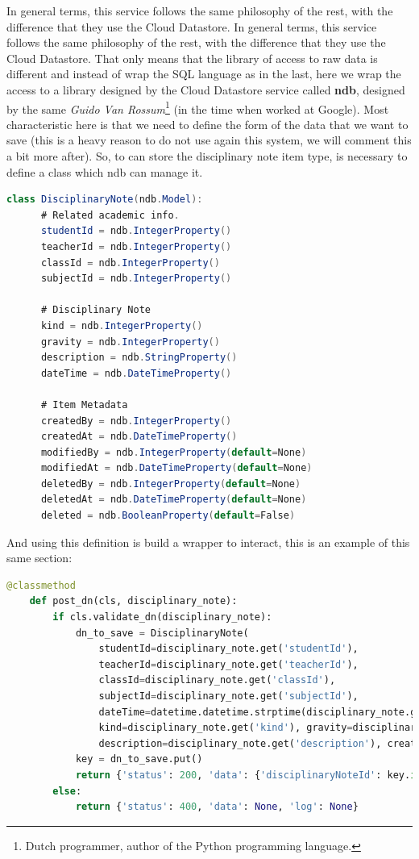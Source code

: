 In general terms, this service follows the same philosophy of the rest, with the
difference that they use the Cloud Datastore. In general terms, this service follows
the same philosophy of the rest, with the difference that they use the Cloud Datastore.
That only means that the library of access to raw data is different and instead of
wrap the SQL language as in the last, here we wrap the access to a library designed
by the Cloud Datastore service called \textbf{ndb}, designed by the same \textit{Guido Van
Rossum}\footnote{Dutch programmer, author of the Python programming language.} (in the time when worked at Google).
\intro
Most characteristic here is that we need to define the form of the data that we
want to save (this is a heavy reason to do not use again this system, we will
comment this a bit more after).
So, to can store the disciplinary note item type, is necessary to define a
class which ndb can manage it.
\begin{lstlisting}[language=java,frame=none]
  class DisciplinaryNote(ndb.Model):
      # Related academic info.
      studentId = ndb.IntegerProperty()
      teacherId = ndb.IntegerProperty()
      classId = ndb.IntegerProperty()
      subjectId = ndb.IntegerProperty()

      # Disciplinary Note
      kind = ndb.IntegerProperty()
      gravity = ndb.IntegerProperty()
      description = ndb.StringProperty()
      dateTime = ndb.DateTimeProperty()

      # Item Metadata
      createdBy = ndb.IntegerProperty()
      createdAt = ndb.DateTimeProperty()
      modifiedBy = ndb.IntegerProperty(default=None)
      modifiedAt = ndb.DateTimeProperty(default=None)
      deletedBy = ndb.IntegerProperty(default=None)
      deletedAt = ndb.DateTimeProperty(default=None)
      deleted = ndb.BooleanProperty(default=False)
\end{lstlisting}

\noindent And using this definition is build a wrapper to interact, this is
an example of this same section:

\begin{lstlisting}[language=python, frame=none]
  @classmethod
    def post_dn(cls, disciplinary_note):
        if cls.validate_dn(disciplinary_note):
            dn_to_save = DisciplinaryNote(
                studentId=disciplinary_note.get('studentId'),
                teacherId=disciplinary_note.get('teacherId'),
                classId=disciplinary_note.get('classId'),
                subjectId=disciplinary_note.get('subjectId'),
                dateTime=datetime.datetime.strptime(disciplinary_note.get('dateTime'),"%Y-%m-%d %H:%M"),
                kind=disciplinary_note.get('kind'), gravity=disciplinary_note.get('gravity'),
                description=disciplinary_note.get('description'), createdBy=1, createdAt=time_now())
            key = dn_to_save.put()
            return {'status': 200, 'data': {'disciplinaryNoteId': key.id()}}
        else:
            return {'status': 400, 'data': None, 'log': None}
\end{lstlisting}

